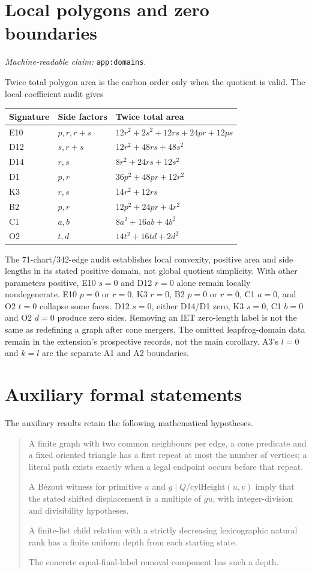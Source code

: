\documentclass[11pt]{amsart}
\newcommand{\record}[1]{\nolinkurl{#1}}
\newcommand{\claimid}[1]{\par\nopagebreak\noindent\textit{Machine-readable claim:} \record{#1}.\par}
\theoremstyle{definition}\newtheorem{definition}{Definition}
\begin{document}
\section{Local polygons and zero boundaries}\label{app:domains}
\claimid{app:domains}
Twice total polygon area is the carbon order only when the quotient
is valid. The local coefficient audit gives
\begin{center}\small
\begin{tabular}{lll}\toprule
Signature & Side factors & Twice total area\\\midrule
E10 & $p,r,r+s$ & $12r^2+2s^2+12rs+24pr+12ps$\\
D12 & $s,r+s$ & $12r^2+48rs+48s^2$\\
D14 & $r,s$ & $8r^2+24rs+12s^2$\\
D1 & $p,r$ & $36p^2+48pr+12r^2$\\
K3 & $r,s$ & $14r^2+12rs$\\
B2 & $p,r$ & $12p^2+24pr+4r^2$\\
C1 & $a,b$ & $8a^2+16ab+4b^2$\\
O2 & $t,d$ & $14t^2+16td+2d^2$\\\bottomrule
\end{tabular}
\end{center}
The 71-chart/342-edge audit establishes local convexity, positive area
and side lengths in its stated positive domain, not global quotient
simplicity. With other parameters positive, E10 $s=0$ and D12 $r=0$
alone remain locally nondegenerate. E10 $p=0$ or $r=0$, K3 $r=0$,
B2 $p=0$ or $r=0$, C1 $a=0$, and O2 $t=0$ collapse some faces.
D12 $s=0$, either D14/D1 zero, K3 $s=0$, C1 $b=0$ and O2 $d=0$
produce zero sides. Removing an IET zero-length label is not the same
as redefining a graph after cone mergers. The omitted leapfrog-domain
data remain in the extension's prospective records, not the main
corollary. A3's $l=0$ and $k=l$ are the separate A1 and A2 boundaries.

\section{Auxiliary formal statements}\label{app:correspondence}
The auxiliary results retain the following mathematical hypotheses.
\begin{quote}\small
A finite graph with two common neighbours per edge, a cone predicate
and a fixed oriented triangle has a first repeat at most the number
of vertices; a literal path exists exactly when a legal endpoint
occurs before that repeat.\par
A B\'ezout witness for primitive $u$ and
$g\mid Q/\mathrm{cylHeight}(u,v)$ imply that the stated shifted
displacement is a multiple of $gu$, with integer-division and
divisibility hypotheses.\par
A finite-list child relation with a strictly decreasing lexicographic
natural rank has a finite uniform depth from each starting state.\par
The concrete equal-final-label removal component has such a depth.
\end{quote}
\end{document}
